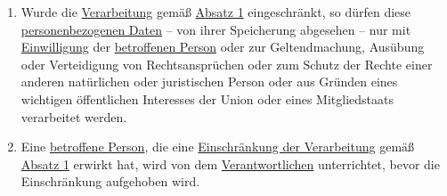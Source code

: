 \begin{enumerate}
\begin{enumerate}
  \end{enumerate}

  \item Wurde die \hyperref[itm:04-2]{Verarbeitung} gemäß \hyperref[itm:18-1]{Absatz 1} eingeschränkt, so dürfen
   diese \hyperref[itm:04-1]{personenbezogenen Daten}
   -- von ihrer Speicherung abgesehen -- nur mit \hyperref[itm:04-11]{Einwilligung} der \hyperref[itm:04-1]
      {betroffenen Person} oder zur Geltendmachung, Ausübung oder Verteidigung von Rechtsansprüchen oder zum Schutz der
      Rechte einer anderen natürlichen oder juristischen Person oder aus Gründen eines wichtigen öffentlichen
      Interesses der Union oder eines Mitgliedstaats verarbeitet werden.%
  \label{itm:18-2}

  \item Eine \hyperref[itm:04-1]{betroffene Person}, die eine \hyperref[itm:04-3]{Einschränkung der Verarbeitung}
   gemäß \hyperref[itm:18-1]{Absatz 1} erwirkt hat, wird von dem \hyperref[itm:04-7]{Verantwortlichen} unterrichtet,
   bevor die Einschränkung aufgehoben wird.%
  \label{itm:18-3}

\end{enumerate}


